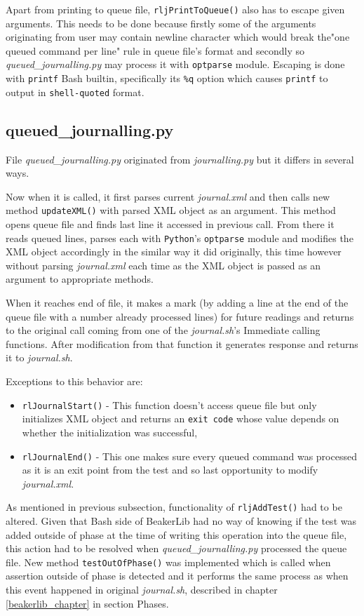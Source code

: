 Apart from printing to queue file, \texttt{rljPrintToQueue()} also has to escape given arguments. This needs to be done because firstly some of the arguments originating from user may contain newline character which would break the"one queued command per line" rule in  queue file's format and secondly so \textit{queued\_journalling.py} may process it with \texttt{optparse} module.
Escaping is done with \texttt{printf} Bash builtin\cite{bash_builtins}, specifically its \texttt{\%q} option which causes \texttt{printf} to output in \texttt{shell-quoted} format.

\subsection{queued\_journalling.py}
File \textit{queued\_journalling.py} originated from \textit{journalling.py} but it differs in several ways.

Now when it is called, it first parses current \textit{journal.xml} and then calls new method \texttt{updateXML()} with parsed XML object as an argument. This method opens queue file and finds last line it accessed in previous call. From there it reads queued lines, parses each with \texttt{Python}'s \texttt{optparse} module and modifies the XML object accordingly in the similar way it did originally, this time however without parsing \textit{journal.xml} each time as the XML object is passed as an argument to appropriate methods. 

When it reaches end of file, it makes a mark (by adding a line at the end of the queue file with a number already processed lines) for future readings and returns to the original call coming from one of the \textit{journal.sh}'s  Immediate calling functions. After modification from that function it generates response and returns it to \textit{journal.sh}. 

Exceptions to this behavior are:
\begin{itemize}
\item \texttt{rlJournalStart()} - This function doesn't access queue file but only initializes XML object and returns an \texttt{exit code} whose value depends on whether the initialization was successful,
\item \texttt{rlJournalEnd()} - This one makes sure every queued command was processed as it is an exit point from the test and so last opportunity to modify \textit{journal.xml}.
\end{itemize}

As mentioned in previous subsection, functionality of  \texttt{rljAddTest()} had to be altered. Given that Bash side of BeakerLib had no way of knowing if the test was added outside of phase at the time of writing this operation into the queue file, this action had to be resolved when \textit{queued\_journalling.py} processed the queue file. 
New method \texttt{testOutOfPhase()} was implemented which is called when assertion outside of phase is detected and it performs the same process as when this event happened in original \textit{journal.sh}, described in chapter \ref{beakerlib_chapter} in section Phases.

